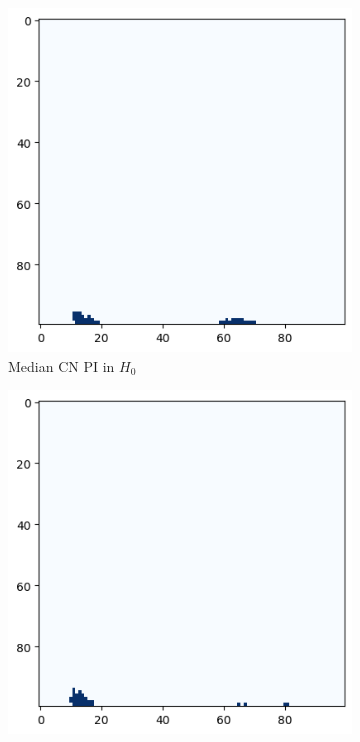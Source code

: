 \documentclass{article}
\begin{document}
\begin{figure}[htb]
  \centering \centering
  \begin{subfigure}{0.32\textwidth}
    \includegraphics[width=\textwidth]{figures/median_pis/median_pi_CN_h_0_rep.png}
    \caption{Median CN PI in $H_0$}
  \end{subfigure}
  \begin{subfigure}{0.32\textwidth}
    \includegraphics[width=\textwidth]{figures/median_pis/median_pi_MCI_h_0_rep.png}

\end{subfigure}
\end{figure}
\end{document}
